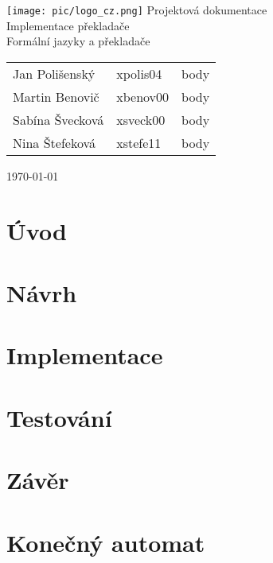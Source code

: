 \documentclass[a4paper, 11pt]{article}
\begin{document}
    \begin{titlepage}
        \begin{center}
            \texttt{[image: pic/logo\_cz.png]}
        \vfill
        {\LARGE{Projektová dokumentace}\\
        \Huge{Implementace překladače} \vspace{10pt}\\
        \large{Formální jazyky a překladače}}
        \vfill
    \end{center}
    {\large
        \begin{tabular}{l l l}
             Jan Polišenský & xpolis04 & body \\
             Martin Benovič & xbenov00 & body \\
             Sabína Švecková & xsveck00 & body \\
             Nina Štefeková & xstefe11 & body \\
        \end{tabular}
    }
    {\large \hfill \today}
    \end{titlepage}
    
\pagestyle{empty}    
\tableofcontents
\newpage

\section{Úvod}

\section{Návrh}

\section{Implementace}

\section{Testování}

\section{Závěr}

\section{Konečný automat}
\end{document}
